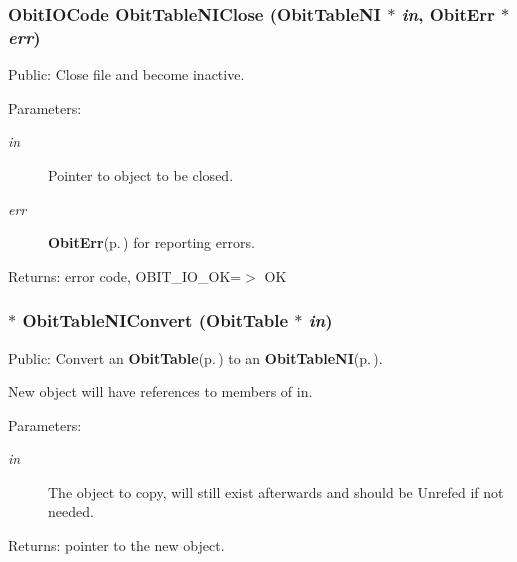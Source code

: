 \subsubsection{\setlength{\rightskip}{0pt plus 5cm}Obit\-IOCode Obit\-Table\-NIClose ({\bf Obit\-Table\-NI} $\ast$ {\em in}, {\bf Obit\-Err} $\ast$ {\em err})}\label{ObitTableNI_8c_a25}


Public: Close file and become inactive. 

\begin{Desc}
\item[Parameters:]
\begin{description}
\item[{\em in}]Pointer to object to be closed. \item[{\em err}]{\bf Obit\-Err}{\rm (p.\,\pageref{structObitErr})} for reporting errors. \end{description}
\end{Desc}
\begin{Desc}
\item[Returns:]error code, OBIT\_\-IO\_\-OK=$>$ OK \end{Desc}
\subsubsection{$\ast$ Obit\-Table\-NIConvert ({\bf Obit\-Table} $\ast$ {\em in})}\label{ObitTableNI_8c_a19}


Public: Convert an {\bf Obit\-Table}{\rm (p.\,\pageref{structObitTable})} to an {\bf Obit\-Table\-NI}{\rm (p.\,\pageref{structObitTableNI})}. 

New object will have references to members of in. \begin{Desc}
\item[Parameters:]
\begin{description}
\item[{\em in}]The object to copy, will still exist afterwards and should be Unrefed if not needed. \end{description}
\end{Desc}
\begin{Desc}
\item[Returns:]pointer to the new object. \end{Desc}
